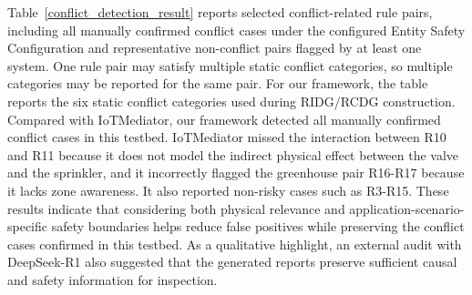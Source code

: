 Table~\ref{conflict_detection_result} reports selected conflict-related rule pairs, including all manually confirmed conflict cases under the configured Entity Safety Configuration and representative non-conflict pairs flagged by at least one system. One rule pair may satisfy multiple static conflict categories, so multiple categories may be reported for the same pair. For our framework, the table reports the six static conflict categories used during RIDG/RCDG construction. Compared with IoTMediator, our framework detected all manually confirmed conflict cases in this testbed. IoTMediator missed the interaction between R10 and R11 because it does not model the indirect physical effect between the valve and the sprinkler, and it incorrectly flagged the greenhouse pair R16-R17 because it lacks zone awareness. It also reported non-risky cases such as R3-R15. These results indicate that considering both physical relevance and application-scenario-specific safety boundaries helps reduce false positives while preserving the conflict cases confirmed in this testbed. As a qualitative highlight, an external audit with DeepSeek-R1 also suggested that the generated reports preserve sufficient causal and safety information for inspection.

